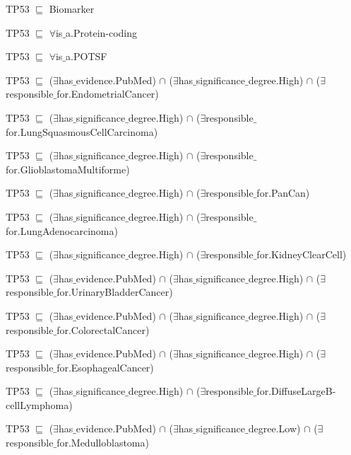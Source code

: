 \begin{itemize}[noitemsep]
\scriptsize{
    \item TP53 $ \sqsubseteq  $ Biomarker
    \item TP53 $ \sqsubseteq  $ $  \forall $is$ {\_}$a.Protein-coding
    \item TP53 $ \sqsubseteq  $ $  \forall $is$ {\_}$a.POTSF
    \item TP53 $ \sqsubseteq  $ ($\exists$has$ {\_}$evidence.PubMed) $  \cap $ ($\exists$has$ {\_}$significance$ {\_}$degree.High) $  \cap $ ($\exists$responsible$ {\_}$for.EndometrialCancer)
    \item TP53 $ \sqsubseteq  $ ($\exists$has$ {\_}$significance$ {\_}$degree.High) $  \cap $ ($\exists$responsible$ {\_}$for.LungSquasmousCellCarcinoma)
    \item TP53 $ \sqsubseteq  $ ($\exists$has$ {\_}$significance$ {\_}$degree.High) $  \cap $ ($\exists$responsible$ {\_}$for.GlioblastomaMultiforme)
    \item TP53 $ \sqsubseteq  $ ($\exists$has$ {\_}$significance$ {\_}$degree.High) $  \cap $ ($\exists$responsible$ {\_}$for.PanCan)
    \item TP53 $ \sqsubseteq  $ ($\exists$has$ {\_}$significance$ {\_}$degree.High) $  \cap $ ($\exists$responsible$ {\_}$for.LungAdenocarcinoma)
    \item TP53 $ \sqsubseteq  $ ($\exists$has$ {\_}$significance$ {\_}$degree.High) $  \cap $ ($\exists$responsible$ {\_}$for.KidneyClearCell)
    \item TP53 $ \sqsubseteq  $ ($\exists$has$ {\_}$evidence.PubMed) $  \cap $ ($\exists$has$ {\_}$significance$ {\_}$degree.High) $  \cap $ ($\exists$responsible$ {\_}$for.UrinaryBladderCancer)
    \item TP53 $ \sqsubseteq  $ ($\exists$has$ {\_}$evidence.PubMed) $  \cap $ ($\exists$has$ {\_}$significance$ {\_}$degree.High) $  \cap $ ($\exists$responsible$ {\_}$for.ColorectalCancer)
    \item TP53 $ \sqsubseteq  $ ($\exists$has$ {\_}$evidence.PubMed) $  \cap $ ($\exists$has$ {\_}$significance$ {\_}$degree.High) $  \cap $ ($\exists$responsible$ {\_}$for.EsophagealCancer)
    \item TP53 $ \sqsubseteq  $ ($\exists$has$ {\_}$significance$ {\_}$degree.High) $  \cap $ ($\exists$responsible$ {\_}$for.DiffuseLargeB-cellLymphoma)
    \item TP53 $ \sqsubseteq  $ ($\exists$has$ {\_}$evidence.PubMed) $  \cap $ ($\exists$has$ {\_}$significance$ {\_}$degree.Low) $  \cap $ ($\exists$responsible$ {\_}$for.Medulloblastoma)
}
\end{itemize}
